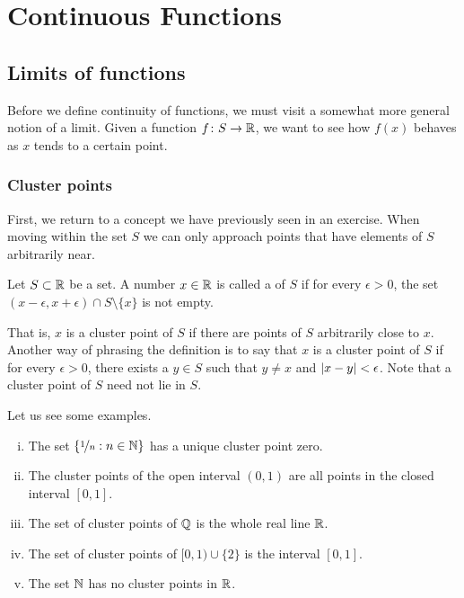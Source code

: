 \chapter{Continuous Functions} \label{lim:chapter}


\section{Limits of functions}
\label{sec:limoffunc}


Before we define continuity of functions, we must visit a somewhat
more general notion of a limit.  Given a function $f \colon S \to
{\mathbb{R}}$, we want to see how $f(x)$ behaves as $x$ tends to a certain point.

\subsection{Cluster points}

First,
we return to a concept we have previously seen in an exercise.
When moving within the set $S$ we can only approach points
that have elements of $S$ arbitrarily near.

\begin{defn}
Let $S \subset {\mathbb{R}}$ be a set.  A number $x \in {\mathbb{R}}$ is called
a \emph{} of $S$
if for every $\epsilon > 0$, the set $(x-\epsilon,x+\epsilon) \cap S
\setminus \{ x \}$ is not empty.
\end{defn}

That is, $x$ is a cluster point of $S$ if there are points of $S$
arbitrarily close to $x$.  Another way of phrasing the definition is to say
that $x$ is a cluster point of $S$ if for every $\epsilon > 0$, there
exists a $y \in S$ such that $y \not= x$ and $\left\lvert {x - y} \right\rvert < \epsilon$.
Note that a cluster point of $S$ need not lie in $S$.

Let us see some examples.
\begin{enumerate}[(i)]
\item The set
$\{ \nicefrac{1}{n} : n \in {\mathbb{N}} \}$ has a unique cluster point zero.
\item The cluster points of the open interval $(0,1)$ are
all points in the closed interval $[0,1]$.
\item
The set of cluster points of ${\mathbb{Q}}$ is the whole real line ${\mathbb{R}}$.
\item 
The set of cluster points of $[0,1) \cup \{ 2 \}$ is the interval $[0,1]$.
\item The set ${\mathbb{N}}$ has no cluster points in ${\mathbb{R}}$.
\end{enumerate}

